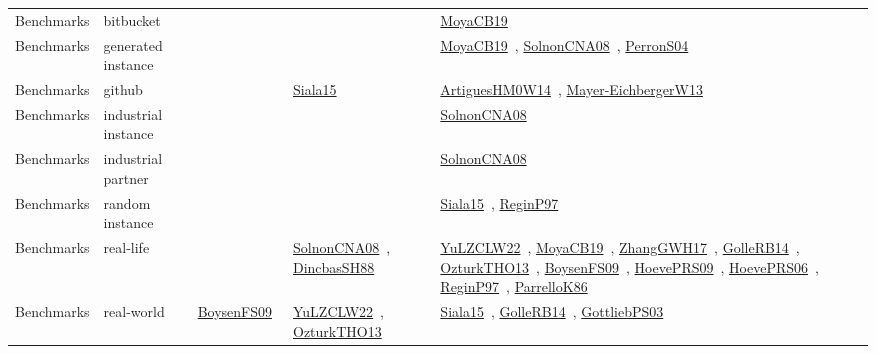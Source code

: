 {\begin{longtable}{lp{3cm}>{\raggedright\arraybackslash}p{6cm}>{\raggedright\arraybackslash}p{6cm}>{\raggedright\arraybackslash}p{8cm}}
Benchmarks & bitbucket &  &  & \href{../cars/works/MoyaCB19.pdf}{MoyaCB19}~\cite{MoyaCB19}\\
Benchmarks & generated instance &  &  & \href{../cars/works/MoyaCB19.pdf}{MoyaCB19}~\cite{MoyaCB19}, \href{../cars/works/SolnonCNA08.pdf}{SolnonCNA08}~\cite{SolnonCNA08}, \href{../cars/works/PerronS04.pdf}{PerronS04}~\cite{PerronS04}\\
Benchmarks & github &  & \href{../cars/works/Siala15.pdf}{Siala15}~\cite{Siala15} & \href{../cars/works/ArtiguesHM0W14.pdf}{ArtiguesHM0W14}~\cite{ArtiguesHM0W14}, \href{../cars/works/Mayer-EichbergerW13.pdf}{Mayer-EichbergerW13}~\cite{Mayer-EichbergerW13}\\
Benchmarks & industrial instance &  &  & \href{../cars/works/SolnonCNA08.pdf}{SolnonCNA08}~\cite{SolnonCNA08}\\
Benchmarks & industrial partner &  &  & \href{../cars/works/SolnonCNA08.pdf}{SolnonCNA08}~\cite{SolnonCNA08}\\
Benchmarks & random instance &  &  & \href{../cars/works/Siala15.pdf}{Siala15}~\cite{Siala15}, \href{../cars/works/ReginP97.pdf}{ReginP97}~\cite{ReginP97}\\
Benchmarks & real-life &  & \href{../cars/works/SolnonCNA08.pdf}{SolnonCNA08}~\cite{SolnonCNA08}, \href{../cars/works/DincbasSH88.pdf}{DincbasSH88}~\cite{DincbasSH88} & \href{../cars/works/YuLZCLW22.pdf}{YuLZCLW22}~\cite{YuLZCLW22}, \href{../cars/works/MoyaCB19.pdf}{MoyaCB19}~\cite{MoyaCB19}, \href{../cars/works/ZhangGWH17.pdf}{ZhangGWH17}~\cite{ZhangGWH17}, \href{../cars/works/GolleRB14.pdf}{GolleRB14}~\cite{GolleRB14}, \href{../cars/works/OzturkTHO13.pdf}{OzturkTHO13}~\cite{OzturkTHO13}, \href{../cars/works/BoysenFS09.pdf}{BoysenFS09}~\cite{BoysenFS09}, \href{../cars/works/HoevePRS09.pdf}{HoevePRS09}~\cite{HoevePRS09}, \href{../cars/works/HoevePRS06.pdf}{HoevePRS06}~\cite{HoevePRS06}, \href{../cars/works/ReginP97.pdf}{ReginP97}~\cite{ReginP97}, \href{../cars/works/ParrelloK86.pdf}{ParrelloK86}~\cite{ParrelloK86}\\
Benchmarks & real-world & \href{../cars/works/BoysenFS09.pdf}{BoysenFS09}~\cite{BoysenFS09} & \href{../cars/works/YuLZCLW22.pdf}{YuLZCLW22}~\cite{YuLZCLW22}, \href{../cars/works/OzturkTHO13.pdf}{OzturkTHO13}~\cite{OzturkTHO13} & \href{../cars/works/Siala15.pdf}{Siala15}~\cite{Siala15}, \href{../cars/works/GolleRB14.pdf}{GolleRB14}~\cite{GolleRB14}, \href{../cars/works/GottliebPS03.pdf}{GottliebPS03}~\cite{GottliebPS03}\\
\end{longtable}
}

